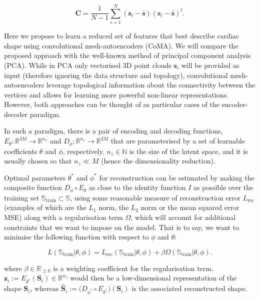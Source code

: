 \begin{equation}
\textbf{C}=\frac{1}{N-1}\sum_{i=1}^{N}({\textbf{s}}_i-\bar{\textbf{s}})({\textbf{s}}_i-\bar{\textbf{s}})^t.
\end{equation}

Here we propose to learn a reduced set of features that best describe cardiac shape using convolutional mesh-autoencoders (CoMA). We will compare the proposed approach with the well-known method of principal component analysis (PCA). While in PCA only vectorised 3D point clouds $\textbf{s}_i$ will be provided as input (therefore ignoring the data structure and topology), convolutional mesh-autoencoders leverage topological information about the connectivity between the vertices and allows for learning more powerful non-linear representations. However, both approaches can be thought of as particular cases of the encoder-decoder paradigm.

In such a paradigm, there is a pair of encoding and decoding functions, $E_{\theta}:\mathbb{R}^{3M}\rightarrow\mathbb{R}^{n_z}$ and $D_{\phi}:\mathbb{R}^{n_z}\rightarrow\mathbb{R}^{3M}$ that are parameterised by a set of learnable coefficients $\theta$ and $\phi$, respectively. $n_z\in\mathbb{N}$ is the size of the latent space, and it is usually chosen so that $n_z\ll M$ (hence the dimensionality reduction). 

Optimal parameters $\theta^*$ and $\phi^*$ for reconstruction can be estimated by making the composite function $D_{\phi} \circ E_{\theta}$ as close to the identity function $I$ as possible over the training set $\mathbb{S}_\text{train}\subset\mathbb{S}$, using some reasonable measure of reconstruction error $L_{\text{rec}}$ (examples of which are the $L_1$ norm, the $L_2$ norm or the mean squared error MSE) along with a regularisation term $\Omega$, which will account for additional constraints that we want to impose on the model. That is to say, we want to minimise the following function with respect to $\phi$ and $\theta$: 

\begin{equation}
L(\mathbb{S}_\text{train}|\theta, \phi)=
L_{\text{rec}}(\mathbb{S}_\text{train}|\theta, \phi)+
\beta\Omega(\mathbb{S}_\text{train}|\theta, \phi).
\label{eq_loss_function}
\end{equation}

\noindent where $\beta\in\mathbb{R_{\geq 0}}$ is a weighting coefficient for the regularisation term. $\textbf{z}_i:= E_{\theta^*}  (\textbf{S}_i)\in\mathbb{R}^{n_z}$ would then be a low-dimensional representation of the shape $\textbf{S}_i$, whereas $\hat{\textbf{S}}_i:=\big(D_{\phi^*} \circ E_{\theta^*}\big)(\textbf{S}_i)$ is the associated reconstructed shape.

